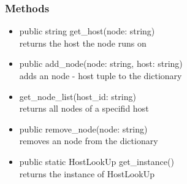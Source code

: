 \subsubsection{Methods}
\begin{itemize}
	\item public string get\_host(node: string)\\
		returns the host the node runs on
	\item public add\_node(node: string, host: string)\\
		adds an node - host tuple to the dictionary
	\item get\_node\_list(host\_id: string)\\
		returns all nodes of a specifid host
	\item public remove\_node(node: string)\\
		removes an node from the dictionary
	\item public static HostLookUp get\_instance()\\
		returns the instance of HostLookUp
\end{itemize}